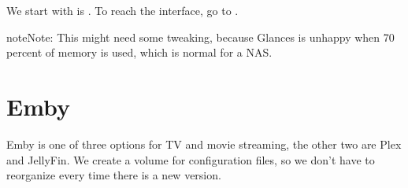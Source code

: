 \documentclass[a4paper,10pt,english]{sphinxmanual}
\begin{document}
\begin{sphinxVerbatim}[commandchars=\\\{\}]
   \PYGZbs{}
  \PYGZbs{}
  \PYGZbs{}
   \PYGZbs{}
  \PYGZbs{}
  \PYGZbs{}
  \PYGZbs{}
\end{sphinxVerbatim}

We start with is . To reach the interface, go to
 .

\begin{sphinxadmonition}{note}{Note:}
This might need some tweaking, because Glances is unhappy when 70 percent
of memory is used, which is normal for a NAS.
\end{sphinxadmonition}


\section{Emby}
\label{\detokenize{containers:emby}}
Emby is one of three options for TV and movie streaming, the other two are Plex
and JellyFin. We create a volume for configuration files, so we don’t have to
reorganize every time there is a new version.

\begin{sphinxVerbatim}[commandchars=\\\{\}]
   
    
\end{sphinxVerbatim}
\end{document}
